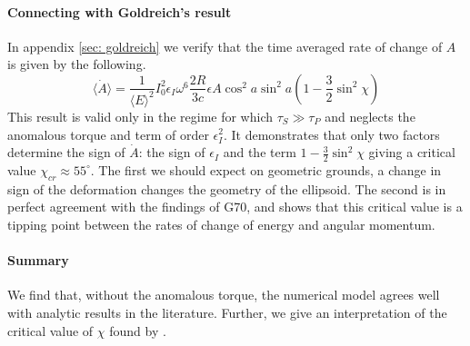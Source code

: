 \documentclass[/home/greg/Thesis/main/main.tex]{subfiles}
\begin{document}
\paragraph{Connecting with Goldreich's result}
In appendix \ref{sec: goldreich} we verify that the time averaged rate of change
of $A$ is given by the following.
\begin{equation}
\langle \dot{A} \rangle =\frac{1}{\langle E\rangle ^{2}}I_{0}^{2}\epsilon_{I}
                          \omega^{6}\frac{2R}{3c}\epsilon{A} \cos^{2} a 
                          \sin^{2}a\left(1-\frac{3}{2}\sin^{2}\chi\right) 
\end{equation}
This result is valid only in the regime for which $\tau_{S}\gg \tau_{P}$ and
neglects the anomalous torque and term of order $\epsilon_{I}^{2}$. It
demonstrates that only two factors determine the sign of $\dot{A}$: the sign of
$\epsilon_{I}$ and the term $1-\frac{3}{2}\sin^{2}\chi$ giving a critical value
$\chi_{cr}\approx55^\circ$. The first we should expect on geometric grounds, a
change in sign of the deformation changes the geometry of the ellipsoid. The
second is in perfect agreement with the findings of G70, and shows that this
critical value is a tipping point between the rates of change of energy and
angular momentum.

%
%
%


\paragraph{Summary} We find that, without the anomalous torque, the numerical
model agrees well with analytic results in the literature. Further, we give an
interpretation of the critical value of $\chi$ found by \citet{Goldreich1970}.
\end{document}
